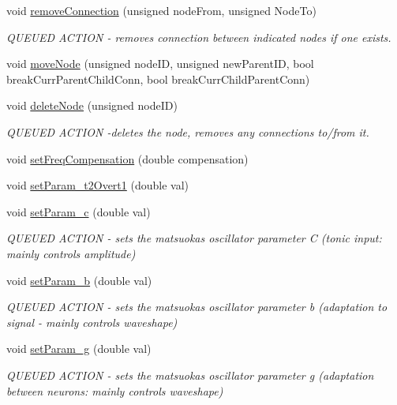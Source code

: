 \begin{DoxyCompactItemize}
void \mbox{\hyperlink{classMatsuokaEngine_a5a6d42576cafa238d020e62bdc9e2204}{remove\+Connection}} (unsigned node\+From, unsigned Node\+To)
\begin{DoxyCompactList}\small\item\em Q\+U\+E\+U\+ED A\+C\+T\+I\+ON -\/ removes connection between indicated nodes if one exists. \end{DoxyCompactList}\item 
void \mbox{\hyperlink{classMatsuokaEngine_abf37008845614f7b6a7ec0440141e06f}{move\+Node}} (unsigned node\+ID, unsigned new\+Parent\+ID, bool break\+Curr\+Parent\+Child\+Conn, bool break\+Curr\+Child\+Parent\+Conn)
\item 
void \mbox{\hyperlink{classMatsuokaEngine_a475f866cfa6cf0e4249483a4ea2d5816}{delete\+Node}} (unsigned node\+ID)
\begin{DoxyCompactList}\small\item\em Q\+U\+E\+U\+ED A\+C\+T\+I\+ON -\/deletes the node, removes any connections to/from it. \end{DoxyCompactList}\item 
void \mbox{\hyperlink{classMatsuokaEngine_a1b932496b53001762dd0224eced6bd09}{set\+Freq\+Compensation}} (double compensation)
\item 
void \mbox{\hyperlink{classMatsuokaEngine_a22a2a27ba2ad7f8ea7a4121326ac8a21}{set\+Param\+\_\+t2\+Overt1}} (double val)
\item 
void \mbox{\hyperlink{classMatsuokaEngine_ad210d56ae83d896c39e72d93a6263035}{set\+Param\+\_\+c}} (double val)
\begin{DoxyCompactList}\small\item\em Q\+U\+E\+U\+ED A\+C\+T\+I\+ON -\/ sets the matsuoka\textquotesingle{}s oscillator parameter C (tonic input\+: mainly controls amplitude) \end{DoxyCompactList}\item 
void \mbox{\hyperlink{classMatsuokaEngine_aa568d548269415a9104a74eaec19d958}{set\+Param\+\_\+b}} (double val)
\begin{DoxyCompactList}\small\item\em Q\+U\+E\+U\+ED A\+C\+T\+I\+ON -\/ sets the matsuoka\textquotesingle{}s oscillator parameter b (adaptation to signal -\/ mainly controls waveshape) \end{DoxyCompactList}\item 
void \mbox{\hyperlink{classMatsuokaEngine_aba4ab083a57717c7dba5d75ff3d1987a}{set\+Param\+\_\+g}} (double val)
\begin{DoxyCompactList}\small\item\em Q\+U\+E\+U\+ED A\+C\+T\+I\+ON -\/ sets the matsuoka\textquotesingle{}s oscillator parameter g (adaptation between neurons\+: mainly controls waveshape) \end{DoxyCompactList}\item 

\end{DoxyCompactItemize}
